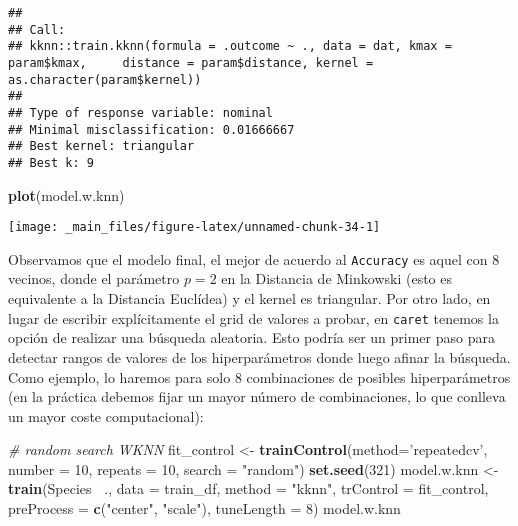 \documentclass[]{book}
\newenvironment{Shaded}{\begin{snugshade}}{\end{snugshade}}
\newcommand{\CommentTok}[1]{\textcolor[rgb]{0.56,0.35,0.01}{\textit{#1}}}
\newcommand{\DataTypeTok}[1]{\textcolor[rgb]{0.13,0.29,0.53}{#1}}
\newcommand{\DecValTok}[1]{\textcolor[rgb]{0.00,0.00,0.81}{#1}}
\newcommand{\KeywordTok}[1]{\textcolor[rgb]{0.13,0.29,0.53}{\textbf{#1}}}
\newcommand{\NormalTok}[1]{#1}
\newcommand{\OperatorTok}[1]{\textcolor[rgb]{0.81,0.36,0.00}{\textbf{#1}}}
\newcommand{\StringTok}[1]{\textcolor[rgb]{0.31,0.60,0.02}{#1}}
\begin{document}
\begin{Shaded}
\end{Shaded}

\begin{verbatim}
## 
## Call:
## kknn::train.kknn(formula = .outcome ~ ., data = dat, kmax = param$kmax,     distance = param$distance, kernel = as.character(param$kernel))
## 
## Type of response variable: nominal
## Minimal misclassification: 0.01666667
## Best kernel: triangular
## Best k: 9
\end{verbatim}

\begin{Shaded}
\begin{Highlighting}[]
\KeywordTok{plot}\NormalTok{(model.w.knn)}
\end{Highlighting}
\end{Shaded}

\begin{center}\texttt{[image: \_main\_files/figure-latex/unnamed-chunk-34-1]} \end{center}

Observamos que el modelo final, el mejor de acuerdo al \texttt{Accuracy} es aquel con 8 vecinos, donde el parámetro \(p=2\) en la Distancia de Minkowski (esto es equivalente a la Distancia Euclídea) y el kernel es triangular. Por otro lado, en lugar de escribir explícitamente el grid de valores a probar, en \texttt{caret} tenemos la opción de realizar una búsqueda aleatoria. Esto podría ser un primer paso para detectar rangos de valores de los hiperparámetros donde luego afinar la búsqueda. Como ejemplo, lo haremos para solo 8 combinaciones de posibles hiperparámetros (en la práctica debemos fijar un mayor número de combinaciones, lo que conlleva un mayor coste computacional):

\begin{Shaded}
\begin{Highlighting}[]
\CommentTok{# random search WKNN}
\NormalTok{fit_control <-}\StringTok{ }\KeywordTok{trainControl}\NormalTok{(}\DataTypeTok{method=}\StringTok{'repeatedcv'}\NormalTok{, }\DataTypeTok{number =} \DecValTok{10}\NormalTok{, }
                            \DataTypeTok{repeats =} \DecValTok{10}\NormalTok{,}
                            \DataTypeTok{search =} \StringTok{"random"}\NormalTok{)}
\KeywordTok{set.seed}\NormalTok{(}\DecValTok{321}\NormalTok{)}
\NormalTok{model.w.knn <-}\StringTok{ }\KeywordTok{train}\NormalTok{(Species }\OperatorTok{~}\NormalTok{.,}
                     \DataTypeTok{data =}\NormalTok{ train_df,}
                     \DataTypeTok{method =} \StringTok{"kknn"}\NormalTok{,}
                     \DataTypeTok{trControl =}\NormalTok{ fit_control,}
                     \DataTypeTok{preProcess =} \KeywordTok{c}\NormalTok{(}\StringTok{"center"}\NormalTok{, }\StringTok{"scale"}\NormalTok{),}
                     \DataTypeTok{tuneLength =} \DecValTok{8}\NormalTok{)}
\NormalTok{model.w.knn}
\end{Highlighting}
\end{Shaded}
\end{document}
